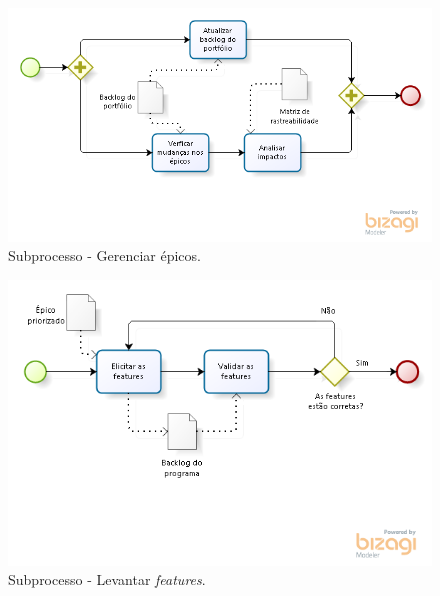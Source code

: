     \begin{figure}[!htbp]
      \centering
      \includegraphics[scale=0.55]{editaveis/figuras/processo_gerenciar_epicos}
      \caption[Subprocesso - Gerenciar épicos]{Subprocesso - Gerenciar épicos.}
      \label{processo_gerenciar_epicos}
    \end{figure}

    \begin{figure}[!htbp]
      \centering
      \includegraphics[scale=0.55]{editaveis/figuras/processo_levantar_features}
      \caption[Subprocesso - Levantar \textit{features}]{Subprocesso - Levantar \textit{features}.}
      \label{processo_levantar_features}
    \end{figure}

